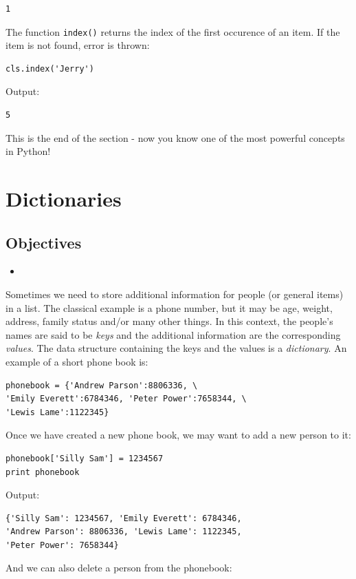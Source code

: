 \begin{verbatim}
1
\end{verbatim}
The function {\tt index()} returns the index of the first occurence 
of an item. If the item is not found, error is thrown:

\begin{verbatim}
cls.index('Jerry')
\end{verbatim}
Output:

\begin{verbatim}
5
\end{verbatim}
This is the end of the section - now you know one of the most powerful 
concepts in Python!

\section{Dictionaries}

\subsection{Objectives}

\begin{itemize}
\item
\end{itemize}

Sometimes we need to store additional information for 
people (or general items) in a list. The classical example is 
a phone number, but it may be age, weight, address, family 
status and/or many other things. In this context, the 
people's names are said to be {\em keys} and the additional 
information are the corresponding {\em values}. The data structure
containing the keys and the values is a {\em dictionary}. An
example of a short phone book is:

\begin{verbatim}
phonebook = {'Andrew Parson':8806336, \
'Emily Everett':6784346, 'Peter Power':7658344, \
'Lewis Lame':1122345}
\end{verbatim}
Once we have created a new phone book, we may want to add a new person to it:

\begin{verbatim}
phonebook['Silly Sam'] = 1234567
print phonebook
\end{verbatim}
Output:

\begin{verbatim}
{'Silly Sam': 1234567, 'Emily Everett': 6784346, 
'Andrew Parson': 8806336, 'Lewis Lame': 1122345, 
'Peter Power': 7658344}
\end{verbatim}
And we can also delete a person from the phonebook:


